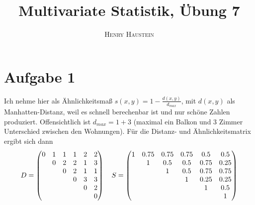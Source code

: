 \documentclass{article}
\title{\textbf{Multivariate Statistik, Übung 7}}
\author{\textsc{Henry Haustein}}
\date{}
\begin{document}
	\maketitle
	
	\section*{Aufgabe 1}
	Ich nehme hier als Ähnlichkeitsmaß $s(x,y) = 1-\frac{d(x,y)}{d_{max}}$, mit $d(x,y)$ als Manhatten-Distanz, weil es schnell berechenbar ist und nur schöne Zahlen produziert. Offensichtlich ist $d_{max} = 1 + 3$ (maximal ein Balkon und 3 Zimmer Unterschied zwischen den Wohnungen). Für die Distanz- und Ähnlichkeitsmatrix ergibt sich dann
	\begin{align}
		D = \begin{pmatrix}
			 0 & 1 & 1 & 1 & 2 & 2 \\
			    & 0 & 2 & 2 & 1 & 3 \\
			    &    & 0 & 2 & 1 & 1 \\
			    &    &    & 0 & 3 & 3 \\
			    &    &    &    & 0 & 2 \\
			    &    &    &    &    & 0
		\end{pmatrix} \quad S = \begin{pmatrix}
			1 & 0.75 & 0.75 & 0.75 & 0.5 & 0.5 \\
			   & 1 & 0.5 & 0.5 & 0.75 & 0.25 \\
			   &    & 1 & 0.5 & 0.75 & 0.75 \\
			   &    &    & 1 & 0.25 & 0.25 \\
			   &    &    &    & 1 & 0.5 \\
			   &    &    &    &    & 1
		\end{pmatrix} \notag
	\end{align}
\end{document}
